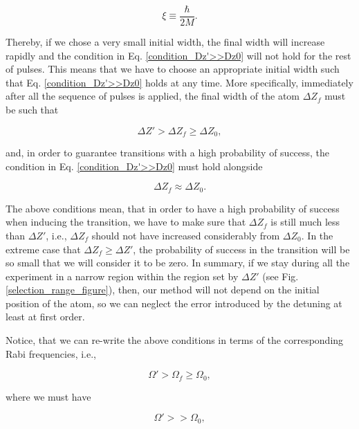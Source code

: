 \documentclass{article}
\begin{document}
\begin{equation}\label{xi_definition_for_expansion}
    \xi \equiv \frac{\hbar}{2M}.
\end{equation}

Thereby, if we chose a very small initial width, the final width will increase rapidly and the condition in Eq. \ref{condition_Dz'>>Dz0} will not hold for the rest of pulses. This means that we have to choose an appropriate initial width such that Eq. \ref{condition_Dz'>>Dz0} holds at any time. More specifically, immediately after all the sequence of pulses is applied, the final width of the atom $\Delta Z_{f}$ must be such that

\begin{equation}\label{condition_transition_width1}
    \Delta Z' > \Delta Z_{f} \ge \Delta Z_{0},
\end{equation}

and, in order to guarantee transitions with a high probability of success, the condition in Eq. \ref{condition_Dz'>>Dz0} must hold alongside

\begin{equation}\label{condition_transition_width2}
    \Delta Z_{f} \approx \Delta Z_{0}.
\end{equation}

The above conditions mean, that in order to have a high probability of success when inducing the transition, we have to make sure that $\Delta Z_{f}$ is still much less than $\Delta Z'$, i.e.,  $\Delta Z_{f}$ should not have increased considerably from $\Delta Z_{0}$. In the extreme case that $\Delta Z_{f} \ge \Delta Z'$, the probability of success in the transition will be so small that we will consider it to be zero. 
In summary, if we stay during all the experiment in a narrow region within the region set by $\Delta Z'$ (see Fig. \ref{selection_range_figure}), then, our method will not depend on the initial position of the atom, so we can neglect the error introduced by the detuning at least at first order.


Notice, that we can re-write the above conditions in terms of the corresponding Rabi frequencies, i.e.,

\begin{equation}
    \Omega' > \Omega_{f} \ge \Omega_{0},
\end{equation}

where we must have

\begin{equation}
    \Omega' >> \Omega_{0},
\end{equation}
\end{document}
